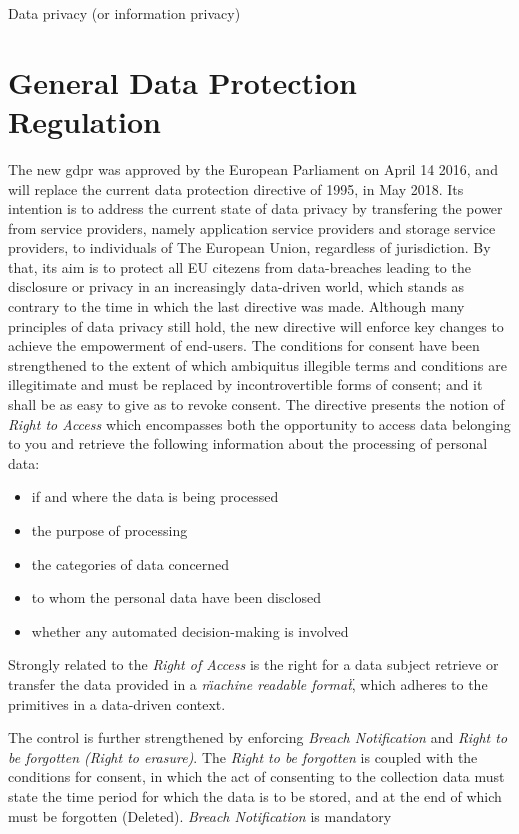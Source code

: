 \documentclass[USenglish]{uit-thesis}
\begin{document}
Data privacy (or information privacy)
\section{General Data Protection Regulation}
The new \gls{gdpr} was approved by the European Parliament on April 14 2016, and will replace the current
data protection directive of 1995, in May 2018.
Its intention is to address the current state of data privacy by transfering the power from
service providers, namely application service providers and storage service providers,
to individuals of The European Union, regardless of jurisdiction.
By that, its aim is to protect all EU citezens from data-breaches leading to
the disclosure or privacy in an increasingly data-driven world, which stands as
contrary to the time in which the last directive was made.
Although many principles of data privacy still hold,
the new directive will enforce key changes to achieve the empowerment of end-users.
The conditions for consent have been strengthened to the extent of which
ambiquitus illegible terms and conditions are illegitimate and must be replaced
by incontrovertible forms of consent; and it shall be as easy to give as to
revoke consent.
The directive presents the notion of \textit{Right to Access} which encompasses
both the opportunity to access data belonging to you and retrieve the following information about
the processing of personal data:
\begin{itemize}
    \item if and where the data is being processed
    \item the purpose of processing
    \item the categories of data concerned
    \item to whom the personal data have been disclosed
    \item whether any automated decision-making is involved
\end{itemize}
Strongly related to the \textit{Right of Access} is the right for a data subject
retrieve or transfer the data provided in a \textit{\"machine readable format\"},
which adheres to the primitives in a data-driven context.

The control is further strengthened by enforcing \textit{Breach Notification} and
\textit{Right to be forgotten (Right to erasure)}.
The \textit{Right to be forgotten} is coupled with the conditions for consent,
in which the act of consenting to the collection data must state the time period
for which the data is to be stored, and at the end of which must be forgotten (Deleted).
\textit{Breach Notification} is mandatory
\end{document}
